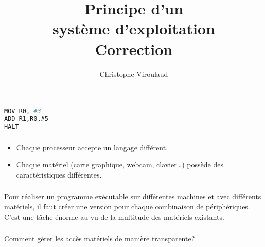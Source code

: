 \documentclass[svgnames,11pt]{beamer}
\author[]{Christophe Viroulaud}
\title{Principe d'un\\système d'exploitation\\Correction}
\date{\framebox{\textbf{ArchMat 08}}}
\institute{Première - NSI}
\begin{document}
\begin{frame}
\titlepage
\end{frame}
\begin{frame}[fragile]
    \frametitle{}

    \begin{center}
        \begin{lstlisting}[language=Bash , basicstyle=\small, xleftmargin=2em, xrightmargin=2em]
MOV R0, #3
ADD R1,R0,#5
HALT
\end{lstlisting}
    \end{center}

\end{frame}
\begin{frame}
    \frametitle{}

    \begin{itemize}
        \item <1-> Chaque processeur accepte un langage différent.
        \item <2-> Chaque matériel (carte graphique, webcam, clavier\dots) possède des caractéristiques différentes.
    \end{itemize}

\end{frame}
\begin{frame}
    \frametitle{}

    \begin{aretenir}[]
    Pour réaliser un programme exécutable sur différentes machines et avec différents matériels, il faut créer une version pour chaque combinaison de périphériques.
    \\
    C'est une tâche énorme au vu de la multitude des matériels existants.
    \end{aretenir}

\end{frame}
\begin{frame}
    \frametitle{}

    \begin{framed}
        \centering Comment gérer les accès matériels de manière transparente?
    \end{framed}

\end{frame}
\end{document}
